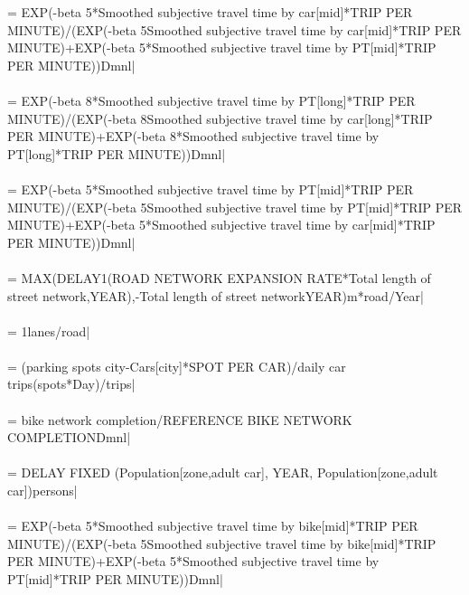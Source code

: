  = {\small EXP(-beta 5*Smoothed subjective travel time by car[mid]*TRIP PER MINUTE)/(EXP(-beta 5\*Smoothed subjective travel time by car[mid]*TRIP PER MINUTE)+EXP(-beta 5*Smoothed subjective travel time by PT[mid]*TRIP PER MINUTE))Dmnl|} \\ \\ 
 = {\small EXP(-beta 8*Smoothed subjective travel time by PT[long]*TRIP PER MINUTE)/(EXP(-beta 8\*Smoothed subjective travel time by car[long]*TRIP PER MINUTE)+EXP(-beta 8*Smoothed subjective travel time by PT[long]*TRIP PER MINUTE))Dmnl|} \\ \\ 
 = {\small EXP(-beta 5*Smoothed subjective travel time by PT[mid]*TRIP PER MINUTE)/(EXP(-beta 5\*Smoothed subjective travel time by PT[mid]*TRIP PER MINUTE)+EXP(-beta 5*Smoothed subjective travel time by car[mid]*TRIP PER MINUTE))Dmnl|} \\ \\ 
 = {\small MAX(DELAY1(ROAD NETWORK EXPANSION RATE*Total length of street network,YEAR),-Total length of street network\/YEAR)m*road/Year|} \\ \\ 
 = {\small 1lanes/road|} \\ \\ 
 = {\small (parking spots city-Cars[city]*SPOT PER CAR)/daily car trips(spots*Day)/trips|} \\ \\ 
 = {\small bike network completion/REFERENCE BIKE NETWORK COMPLETIONDmnl|} \\ \\ 
 = {\small  DELAY FIXED (Population[zone,adult car], YEAR, Population[zone,adult car])persons|} \\ \\ 
 = {\small EXP(-beta 5*Smoothed subjective travel time by bike[mid]*TRIP PER MINUTE)/(EXP(-beta 5\*Smoothed subjective travel time by bike[mid]*TRIP PER MINUTE)+EXP(-beta 5*Smoothed subjective travel time by PT[mid]*TRIP PER MINUTE))Dmnl|} \\ \\ 
